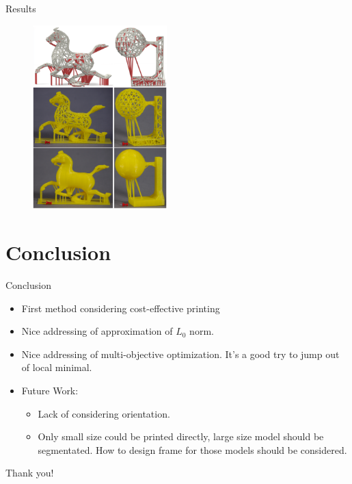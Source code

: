 \documentclass{beamer}
\begin{document}
\begin{frame}{Results}
\begin{figure}
\centering
\includegraphics[height=2.8in]{./img/result2.png}
\end{figure}
\end{frame}


\section{Conclusion}
\begin{frame}{Conclusion}
\begin{itemize}
\item First method considering cost-effective printing
\item Nice addressing of approximation of $L_0$ norm.
\item Nice addressing of multi-objective optimization. It's a good try to jump out of local minimal.
\item Future Work:
  \begin{itemize}
    \item Lack of considering orientation.
    \item Only small size could be printed directly, large size model should be segmentated. How to design frame for those models should be considered.
  \end{itemize}
\end{itemize}
\end{frame}

\begin{frame}{}
\hspace{1.5in}\huge{Thank you!}
\end{frame}
\end{document}
